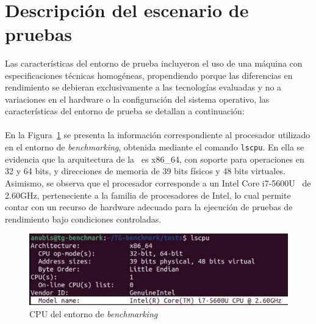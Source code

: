 \label{cap:benchmarking}

\mbox{}\\
\section{Descripción del escenario de pruebas}\label{sec:escenario-pruebas}
\noindent
Las características del entorno de prueba incluyeron el uso de una máquina con especificaciones técnicas homogéneas, propendiendo  porque las diferencias en rendimiento se debieran exclusivamente a las tecnologías evaluadas y no a variaciones en el hardware o la configuración del sistema operativo, las características del entorno de prueba se detallan a continuación:\\ \\
\noindent
En la Figura~\ref{fig:CPU-benchmarking} se presenta la información correspondiente al procesador utilizado en el entorno de \textit{benchmarking}, obtenida mediante el comando \texttt{lscpu}. En ella se evidencia que la arquitectura de la \CPU\ es x86\_64, con soporte para operaciones en 32 y 64 bits, y direcciones de memoria de 39 bits físicos y 48 bits virtuales. Asimismo, se observa que el procesador corresponde a un Intel Core i7-5600U \CPU\ de 2.60GHz, perteneciente a la familia de procesadores de Intel, lo cual permite contar con un recurso de hardware adecuado para la ejecución de pruebas de rendimiento bajo condiciones controladas.
\begin{figure}[H]
    \centering
    \includegraphics[width=\textwidth,height=0.85\textheight,keepaspectratio]{apendices/ENV-BENCH/CPU.png}
    \caption{CPU del entorno de \textit{benchmarking}}\label{fig:CPU-benchmarking}
\end{figure}

